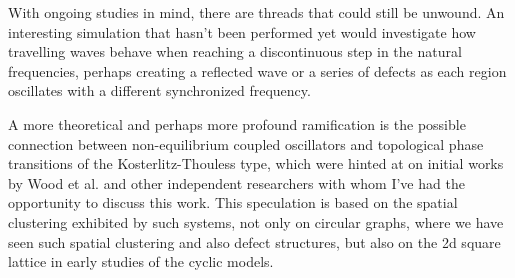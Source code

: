 With ongoing studies in mind, there are threads that could still be unwound. An interesting simulation that hasn't been performed yet
would investigate how travelling waves behave when reaching a discontinuous step in the natural frequencies, perhaps creating a reflected wave
or a series of defects as each region oscillates with a different synchronized frequency.

A more theoretical and perhaps more profound ramification is the possible connection between non-equilibrium coupled oscillators and
topological phase transitions of the Kosterlitz-Thouless type, which were hinted at on initial works by Wood et al. \cite{Wood06a} and
other independent researchers with whom I've had the opportunity to discuss this work. This speculation is based on the spatial
clustering exhibited by such systems, not only on circular graphs, where we have seen such spatial clustering and also defect
structures, but also on the 2d square lattice in early studies of the cyclic models.
